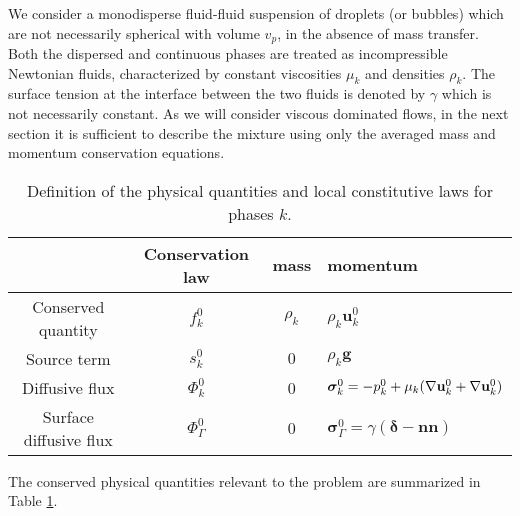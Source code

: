 We consider a monodisperse fluid-fluid suspension of droplets (or bubbles) which are not necessarily spherical with volume \( v_p \), in the absence of mass transfer. 
Both the dispersed and continuous phases are treated as incompressible Newtonian fluids, characterized by constant viscosities \( \mu_k \) and densities \( \rho_k \). 
The surface tension at the interface between the two fluids is denoted by \( \gamma \) which is not necessarily constant.%
As we will consider viscous dominated flows, in the next section it is sufficient to describe the mixture using only the averaged mass and momentum conservation equations.
\begin{table}
    \centering
    \begin{tabular}{|c|ccl|}\hline
    & Conservation law & mass & momentum \\ \hline
    Conserved quantity & $f_k^0$  & $\rho_k$ & $\rho_k \textbf{u}_k^0$ \\
    Source term & $s_k^0$  & $0$ & $\rho_k \textbf{g}$ \\
    Diffusive flux & $\Phi_k^0$ & 0 & $\bm\sigma_k^0 = -p_k^0 + \mu_k (\mathbf{\nabla} \textbf{u}_k^0 + \mathbf{\nabla} \textbf{u}_k^0)$ \\
    Surface diffusive flux & $\Phi_\Gamma^0$ & 0 & $\bm\sigma_\Gamma^0 = \gamma (\bm\delta - \textbf{nn})$ \\\hline
    \end{tabular}

    \caption{Definition of the physical quantities and local constitutive laws for phases $k$.}
    \label{tab:qte_Newtonian}
\end{table}
The conserved physical quantities  relevant to the problem are summarized in Table \ref{tab:qte_Newtonian}.




